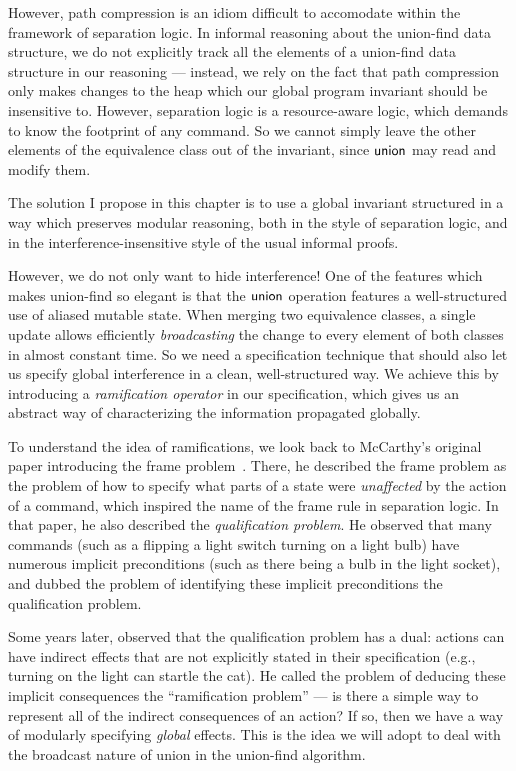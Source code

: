 However, path compression is an idiom difficult to accomodate within
the framework of separation logic. In informal reasoning about the
union-find data structure, we do not explicitly track all the elements
of a union-find data structure in our reasoning --- instead, we rely
on the fact that path compression only makes changes to the heap which
our global program invariant should be insensitive to. However,
separation logic is a resource-aware logic, which demands to know the
footprint of any command. So we cannot simply leave the other elements
of the equivalence class out of the invariant, since $\mathsf{union}$ may read
and modify them.

The solution I propose in this chapter is to use a global invariant
structured in a way which preserves modular reasoning, both in the
style of separation logic, and in the interference-insensitive style
of the usual informal proofs. 

However, we do not only want to hide interference! One of the features
which makes union-find so elegant is that the $\mathsf{union}$ operation
features a well-structured use of aliased mutable state.  When merging
two equivalence classes, a single update allows efficiently
\emph{broadcasting} the change to every element of both classes in
almost constant time.  So we need a specification technique that
should also let us specify global interference in a clean,
well-structured way. We achieve this by introducing a
\emph{ramification operator} in our specification, which gives us an
abstract way of characterizing the information propagated globally.

To understand the idea of ramifications, we look back to McCarthy's
original paper introducing the frame problem~\cite{mccarthy}. There,
he described the frame problem as the problem of how to specify what
parts of a state were \emph{unaffected} by the action of a command,
which inspired the name of the frame rule in separation logic. In that
paper, he also described the \emph{qualification problem}. He observed
that many commands (such as a flipping a light switch turning on a
light bulb) have numerous implicit preconditions (such as there being
a bulb in the light socket), and dubbed the problem of identifying
these implicit preconditions the qualification problem.

Some years later, \citet{finger} observed that the qualification
problem has a dual: actions can have indirect effects that are not
explicitly stated in their specification (e.g., turning on the light can
startle the cat). He called the problem of deducing these implicit
consequences the ``ramification problem'' --- is there a simple way to
represent all of the indirect consequences of an action? If so, then 
we have a way of modularly specifying \emph{global} effects. This is
the idea we will adopt to deal with the broadcast nature of \textsf{union}
in the union-find algorithm. 

